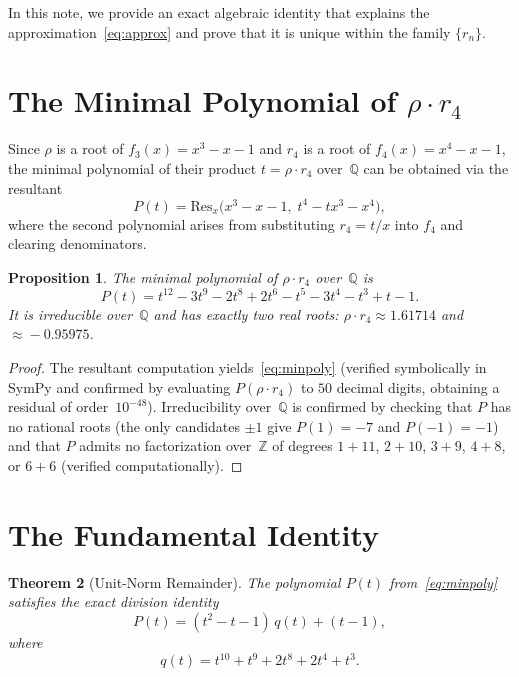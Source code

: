 \documentclass[12pt]{article}
\newtheorem{theorem}{Theorem}
\newtheorem{proposition}[theorem]{Proposition}
\newcommand{\Z}{\mathbb{Z}}
\newcommand{\Q}{\mathbb{Q}}
\begin{document}
In this note, we provide an exact algebraic identity that explains the
approximation~\eqref{eq:approx} and prove that it is unique within the
family $\{r_n\}$.


\section{The Minimal Polynomial of $\rho \cdot r_4$}

Since $\rho$ is a root of $f_3(x) = x^3 - x - 1$ and $r_4$ is a root
of $f_4(x) = x^4 - x - 1$, the minimal polynomial of their product
$t = \rho \cdot r_4$ over~$\Q$ can be obtained via the resultant
\[
  P(t) = \mathrm{Res}_x\!\big(x^3 - x - 1,\; t^4 - t x^3 - x^4\big),
\]
where the second polynomial arises from substituting $r_4 = t/x$ into
$f_4$ and clearing denominators.

\begin{proposition}\label{prop:minpoly}
The minimal polynomial of $\rho \cdot r_4$ over~$\Q$ is
\begin{equation}\label{eq:minpoly}
  P(t) = t^{12} - 3t^9 - 2t^8 + 2t^6 - t^5 - 3t^4 - t^3 + t - 1.
\end{equation}
It is irreducible over~$\Q$ and has exactly two real roots:
$\rho \cdot r_4 \approx 1.61714$ and $\approx\! -0.95975$.
\end{proposition}

\begin{proof}
The resultant computation yields~\eqref{eq:minpoly} (verified
symbolically in SymPy and confirmed by evaluating $P(\rho \cdot r_4)$
to $50$ decimal digits, obtaining a residual of order~$10^{-48}$).
Irreducibility over~$\Q$ is confirmed by checking that $P$ has no
rational roots (the only candidates $\pm 1$ give $P(1) = -7$ and
$P(-1) = -1$) and that $P$ admits no factorization over~$\Z$ of
degrees $1{+}11$, $2{+}10$, $3{+}9$, $4{+}8$, or $6{+}6$ (verified
computationally).
\end{proof}


\section{The Fundamental Identity}

\begin{theorem}[Unit-Norm Remainder]\label{thm:main}
The polynomial $P(t)$ from~\eqref{eq:minpoly} satisfies the exact
division identity
\begin{equation}\label{eq:division}
  P(t) = (t^2 - t - 1)\,q(t) + (t - 1),
\end{equation}
where
\begin{equation}\label{eq:quotient}
  q(t) = t^{10} + t^9 + 2t^8 + 2t^4 + t^3.
\end{equation}
\end{theorem}
\end{document}
